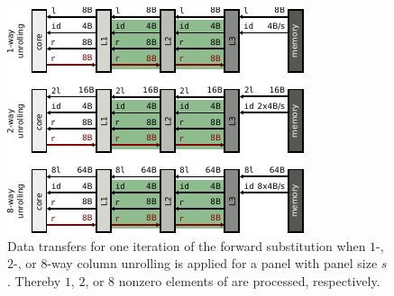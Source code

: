 \begin{figure}[t]
  \centering%
  \includegraphics[width=0.75\linewidth,clip=true]{images/ecm-datatransfers-fw}
  \caption{Data transfers for one iteration of the forward
    substitution when \protect\linebreak $1$-, $2$-, or $8$-way column unrolling is applied
    for a panel with panel size $s$.
    Thereby $1$, $2$, or $8$ nonzero elements of \vlnz{} are processed,
    respectively.
  }
  \label{fig:ecm:data-fw}
\end{figure}

%

